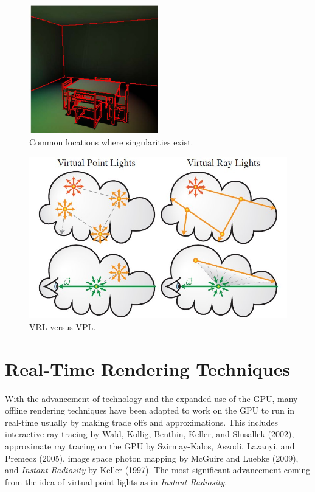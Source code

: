 \begin{figure}[h!]
  \centering
    \includegraphics[width=0.5\textwidth]{singularity.jpg}
  \caption{Common locations where singularities exist.}
	\label{fig:singularity}
\end{figure}

\begin{figure}[h!]
  \centering
    \includegraphics[width=1.0\textwidth]{vrl.jpg}
  \caption{VRL versus VPL.}
	\label{fig:vrl}
\end{figure}

\section{Real-Time Rendering Techniques} \label{sec:RT}
\paragraph{}
With the advancement of technology and the expanded use of the GPU, many offline rendering techniques have been adapted to work on the GPU to run in real-time usually by making trade offs and approximations.  This includes interactive ray tracing by Wald, Kollig, Benthin, Keller, and Slusallek (2002), approximate ray tracing on the GPU by Szirmay-Kalos, Aszodi, Lazanyi, and Premecz (2005), image space photon mapping by McGuire and Luebke (2009), and \textit{Instant Radiosity} by Keller (1997).  The most significant advancement coming from the idea of virtual point lights as in \textit{Instant Radiosity}.


